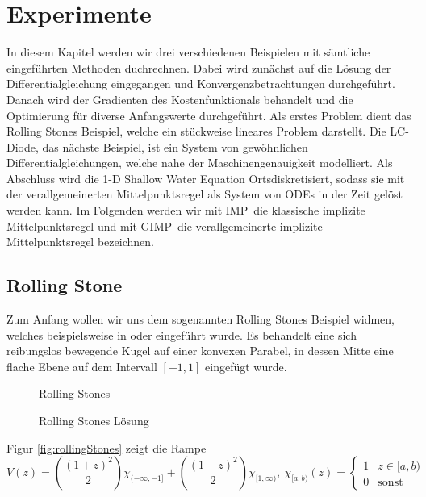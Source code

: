 \chapter{Experimente}
In diesem Kapitel werden wir drei verschiedenen Beispielen mit sämtliche eingeführten Methoden duchrechnen. Dabei wird zunächst auf die Lösung der Differentialgleichung eingegangen und Konvergenzbetrachtungen durchgeführt. Danach wird der Gradienten des Kostenfunktionals behandelt und die Optimierung für diverse Anfangswerte durchgeführt.
Als erstes Problem dient das Rolling Stones Beispiel, welche ein stückweise lineares Problem darstellt. Die LC- Diode, das nächste Beispiel, ist ein System von gewöhnlichen Differentialgleichungen, welche nahe der Maschinengenauigkeit modelliert. Als Abschluss wird die 1-D Shallow Water Equation Ortsdiskretisiert, sodass sie mit der verallgemeinerten Mittelpunktsregel als System von ODEs in der Zeit gelöst werden kann. Im Folgenden werden wir mit \glqq IMP\grqq~die klassische implizite Mittelpunktsregel und mit \glqq GIMP\grqq~die verallgemeinerte implizite Mittelpunktsregel bezeichnen.

\section{Rolling Stone}
Zum Anfang wollen wir uns dem sogenannten Rolling Stones Beispiel widmen, welches beispielsweise in \cite{boeck2014experiments} oder \cite{hasenfelder13} eingeführt wurde. 
Es behandelt eine sich reibungslos bewegende Kugel auf einer konvexen Parabel, in dessen Mitte eine flache Ebene auf dem Intervall $[-1,1]$ eingefügt wurde. 
\begin{figure}[ht]
\centering
\begin{minipage}[b]{0.49\linewidth}

\caption{Rolling Stones}
\label{fig:rollingStones}
\end{minipage}
\begin{minipage}[b]{0.49\linewidth}

\caption{Rolling Stones Lösung}
\label{fig:rollingStonesSolution}
\end{minipage}
\end{figure}
Figur \ref{fig:rollingStones} zeigt die Rampe
\[
 V(z) = \left(\frac{(1+z)^2}{2}\right)\chi_{(-\infty,-1]} + \left(\frac{(1-z)^2}{2}\right)\chi_{[1,\infty)} ,
 ~ \chi_{[a,b)}(z) = 
 \begin{cases}
  1 & z \in [a,b)\\
  0 & \text{sonst}
 \end{cases}
\]

